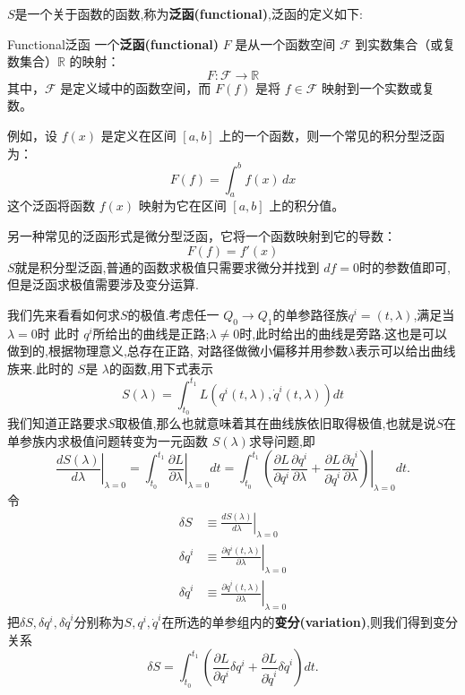 \documentclass[../main.tex]{subfiles}
\begin{document}
$S$是一个关于函数的函数,称为\textbf{泛函(functional)},泛函的定义如下:
\begin{definition}
{Functional}{泛函}
  一个\textbf{泛函(functional)} \( F \) 是从一个函数空间 \( \mathscr{F} \) 到实数集合（或复数集合）\( \mathbb{R} \) 的映射：
\[
F : \mathscr{F} \to \mathbb{R}
\]
其中，\( \mathscr{F} \) 是定义域中的函数空间，而 \( F(f) \) 是将 \( f \in \mathscr{F} \) 映射到一个实数或复数。
\end{definition}
\begin{note}
例如，设 \( f(x) \) 是定义在区间 \( [a, b] \) 上的一个函数，则一个常见的积分型泛函为：
\[
F(f) = \int_a^b f(x) \, dx
\]
这个泛函将函数 \( f(x) \) 映射为它在区间 \( [a, b] \) 上的积分值。

另一种常见的泛函形式是微分型泛函，它将一个函数映射到它的导数：
\[
F(f) = f'(x)
\]
$S$就是积分型泛函,普通的函数求极值只需要求微分并找到 $df = 0$时的参数值即可,但是泛函求极值需要涉及变分运算.
\end{note}
我们先来看看如何求$S$的极值.考虑任一 $Q_0\to Q_1$的单参路径族$q^i = (t, \lambda)$,满足当$\lambda = 0$时
此时 $q^i$所给出的曲线是正路;$\lambda \neq 0$时,此时给出的曲线是旁路.这也是可以做到的,根据物理意义,总存在正路,
对路径做微小偏移并用参数$\lambda$表示可以给出曲线族来.此时的 $S$是 $\lambda$的函数,用下式表示
\begin{equation*}
  S(\lambda) = \int^{t_1}_{t_0}L(q^i(t,\lambda),\dot{q}^i(t,\lambda))dt 
\end{equation*}
我们知道正路要求$S$取极值,那么也就意味着其在曲线族依旧取得极值,也就是说$S$在单参族内求极值问题转变为一元函数 $S(\lambda)$求导问题,即
 \[
   \left.\frac{d S(\lambda)}{d\lambda}\right|_{\lambda = 0} = \int^{t_1}_{t_0}\left.\frac{\partial L}{\partial \lambda}\right|_{\lambda = 0}dt 
       = \int^{t_1}_{t_0}\left.\left(\frac{\partial L}{\partial q^i}\frac{\partial q^i}{\partial \lambda}+ \frac{\partial L}{\partial \dot{q}^i} \frac{\partial \dot{q}^i}{\partial \lambda} \right)\right|_{\lambda = 0} dt
  .\] 
令
\begin{align*}
  \delta S &\equiv \left.\frac{dS(\lambda)}{d \lambda}\right|_{\lambda = 0}\\
    \delta q^i &\equiv \left.\frac{\partial q^i(t,\lambda)}{ \partial \lambda}\right|_{\lambda = 0}\\
      \delta  \dot{q}^i&\equiv \left.\frac{\partial\dot{q}^i(t,\lambda)}{ \partial \lambda  }\right|_{\lambda = 0} 
\end{align*}
把$\delta S, \delta q^i, \delta \dot{q}^i$分别称为$S, q^i, \dot{q}^i$在所选的单参组内的\textbf{变分(variation)},则我们得到变分关系 \[
  \delta S = \int^{t_1}_{t_0} \left( \frac{\partial L}{ \partial q^i}\delta q^i + \frac{\partial L}{\partial \dot{q}^i} \delta \dot{q}^i   \right)dt 
.\] 
\end{document}
